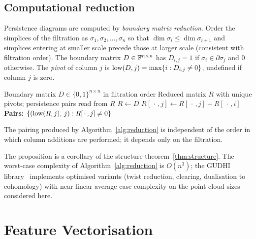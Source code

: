 \subsection{Computational reduction}
\label{subsubsec:reduction}

Persistence diagrams are computed by \emph{boundary matrix reduction}. Order the simplices of the filtration as $\sigma_1,\sigma_2,\ldots,\sigma_n$ so that $\dim\sigma_i\leq\dim\sigma_{i+1}$ and simplices entering at smaller scale precede those at larger scale (consistent with filtration order). The boundary matrix $D\in\mathbb{F}^{n\times n}$ has $D_{i,j}=1$ if $\sigma_i\in\partial\sigma_j$ and $0$ otherwise. The \emph{pivot} of column $j$ is $\operatorname{low}(D,j)=\max\{i:D_{i,j}\neq 0\}$, undefined if column $j$ is zero.

\begin{algorithm}[H]
\caption{Standard persistence algorithm (column reduction over $\F_2$).}
\label{alg:reduction}
\begin{algorithmic}[1]
\Require Boundary matrix $D\in\{0,1\}^{n\times n}$ in filtration order
\Ensure Reduced matrix $R$ with unique pivots; persistence pairs read from $R$
\State $R\leftarrow D$
    \State $R[\,\cdot\,,j]\leftarrow R[\,\cdot\,,j]+R[\,\cdot\,,i]$ 
  \EndWhile
\EndFor
\State \textbf{Pairs:} $\{(\operatorname{low}(R,j),\,j):R[\,\cdot\,,j]\neq 0\}$
\end{algorithmic}
\end{algorithm}

\begin{proposition}
\label{prop:reduction-unique}
The pairing produced by Algorithm~\ref{alg:reduction} is independent of the order in which column additions are performed; it depends only on the filtration.
\end{proposition}

The proposition is a corollary of the structure theorem~\ref{thm:structure}. The worst-case complexity of Algorithm~\ref{alg:reduction} is $O(n^3)$; the GUDHI library~\parencite{gudhi} implements optimised variants (twist reduction, clearing, dualisation to cohomology) with near-linear average-case complexity on the point cloud sizes considered here.

\section{Feature Vectorisation}
\label{subsec:vectorization}

